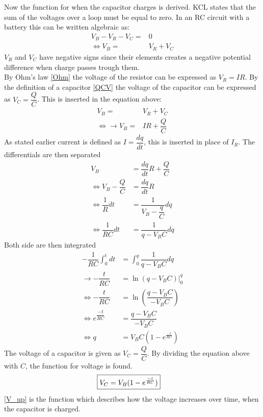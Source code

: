 \\
\\
Now the function for when the capacitor charges is derived. KCL states that the sum of the voltages over a loop must be equal to zero. In an RC circuit with a battery this can be written algebraic as:
\begin{align*}
V_B-V_R-V_C =& 0 \\
\Leftrightarrow V_B=&V_R+V_C
\end{align*}
$V_R$ and $V_C$ have negative signs since their elements creates a negative potential difference when charge passes trough them.
\\
By Ohm's law \eqref{Ohm} the voltage of the resistor can be expressed as $V_R=IR$. By the definition of a capacitor \eqref{QCV} the voltage of the capacitor can be expressed as $V_C=\dfrac{Q}{C}$. This is inserted in the equation above:
\begin{align*}
V_B=&V_R+V_C \\
\Leftrightarrow \rightarrow V_B =& IR+\dfrac{Q}{C}
\end{align*}
As stated earlier current is defined as $I =\dfrac{dq}{dt}$, this is inserted in place of $I_R$. The differentials are then separated
\begin{align*}
V_B &= \dfrac{dq}{dt} R + \dfrac{Q}{C} \\
\Leftrightarrow V_B - \dfrac{Q}{C} &= \dfrac{dq}{dt}R \\
\Leftrightarrow \dfrac{1}{R}dt &= \dfrac{1}{V_B-\dfrac{q}{C}}dq \\
\Leftrightarrow \dfrac{1}{RC}dt &= \dfrac{1}{q-V_BC} dq
\end{align*}
Both side are then integrated
\begin{align*}
-\dfrac{1}{RC}\int_{0}^t dt &= \int_{0}^q \dfrac{1}{q-V_BC}dq \\
\rightarrow -\dfrac{t}{RC} &= \ln(q-V_BC) |_{0}^{q} \\
\Leftrightarrow -\dfrac{t}{RC} &= \ln(\dfrac{q-V_BC}{-V_BC}) \\
\Leftrightarrow e^{\dfrac{-t}{RC}} &= \dfrac{q-V_BC}{-V_BC} \\
\Leftrightarrow q &= V_BC(1-e^{\frac{-t}{RC}})
\end{align*}
The voltage of a capacitor is given as $V_C=\dfrac{Q}{C}$. By dividing the equation above with $C$, the function for voltage is found.
\begin{align}
\label{V_up}
\Aboxed{
V_C=V_B(1-e^{\frac{-t}{RC}})
}
\end{align}
\eqref{V_up} is the function which describes how the voltage increases over time, when the capacitor is charged.

